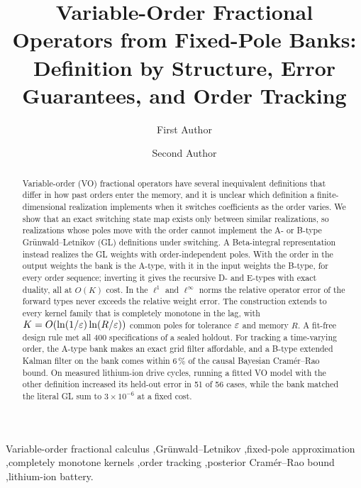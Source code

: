 \documentclass[review,12pt]{elsarticle}
\begin{document}
\begin{frontmatter}
\title{Variable-Order Fractional Operators from Fixed-Pole Banks: Definition by Structure, Error Guarantees, and Order Tracking}

\author[inst]{First Author}
\author[inst]{Second Author}

\begin{abstract}
Variable-order (VO) fractional operators have several inequivalent definitions that differ in how past orders enter the memory, and it is unclear which definition a finite-dimensional realization implements when it switches coefficients as the order varies. We show that an exact switching state map exists only between similar realizations, so realizations whose poles move with the order cannot implement the A- or B-type Gr\"unwald--Letnikov (GL) definitions under switching. A Beta-integral representation instead realizes the GL weights with order-independent poles. With the order in the output weights the bank is the A-type, with it in the input weights the B-type, for every order sequence; inverting it gives the recursive D- and E-types with exact duality, all at $O(K)$ cost. In the $\ell^1$ and $\ell^\infty$ norms the relative operator error of the forward types never exceeds the relative weight error. The construction extends to every kernel family that is completely monotone in the lag, with $K=O(\ln(1/\varepsilon)\ln(R/\varepsilon))$ common poles for tolerance $\varepsilon$ and memory $R$. A fit-free design rule met all 400 specifications of a sealed holdout. For tracking a time-varying order, the A-type bank makes an exact grid filter affordable, and a B-type extended Kalman filter on the bank comes within 6\,\% of the causal Bayesian Cram\'er--Rao bound. On measured lithium-ion drive cycles, running a fitted VO model with the other definition increased its held-out error in 51 of 56 cases, while the bank matched the literal GL sum to $3\times10^{-6}$ at a fixed cost.
\end{abstract}

\begin{keyword}
Variable-order fractional calculus \sep Gr\"unwald--Letnikov \sep fixed-pole approximation \sep completely monotone kernels \sep order tracking \sep posterior Cram\'er--Rao bound \sep lithium-ion battery.
\end{keyword}
\end{frontmatter}


\end{document}
